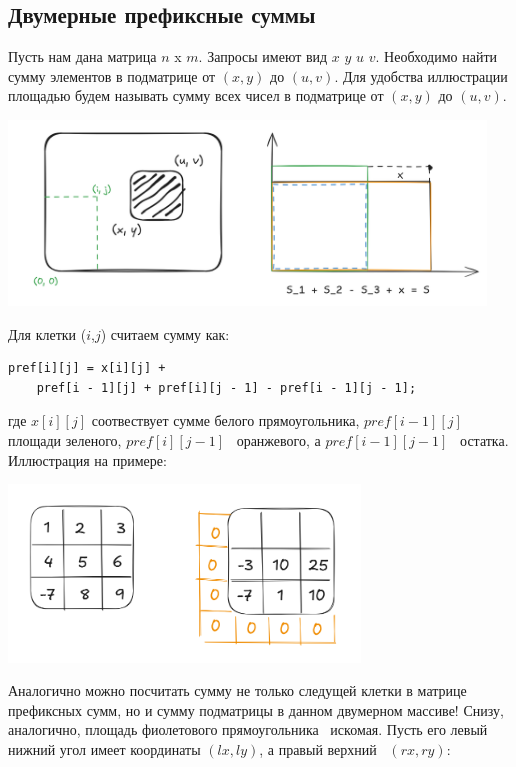 \documentclass[a4paper,12pt]{article}
\begin{document}
\subsection{Двумерные префиксные суммы}
Пусть нам дана матрица $n$ x $m$. Запросы имеют вид $x$ $y$ $u$ $v$.
Необходимо найти сумму элементов в подматрице от $(x,y)$ до $(u,v)$. Для
удобства иллюстрации площадью будем называть сумму всех чисел в подматрице
от $(x, y)$ до $(u, v)$.
\begin{center}
	\includegraphics[width=0.95\textwidth]{../assets/matrixprefsum.png}
\end{center}

Для клетки ($i$,$j$) считаем сумму как:
\begin{verbatim}
pref[i][j] = x[i][j] +
    pref[i - 1][j] + pref[i][j - 1] - pref[i - 1][j - 1];
\end{verbatim}
где $x[i][j]$ соотвествует сумме белого прямоугольника, $pref[i - 1][j]$
площади зеленого, $pref[i][j - 1]$ \textendash\ оранжевого,
а $pref[i - 1][j - 1]$ \textendash\ остатка.
Иллюстрация на примере:
\begin{center}
	\includegraphics[width=0.7\textwidth]{../assets/mprefsumill.png}
\end{center}

Аналогично можно посчитать сумму не только следущей клетки в матрице
префиксных сумм, но и сумму подматрицы в данном двумерном массиве!
Снизу, аналогично, площадь фиолетового прямоугольника \textendash\
искомая. Пусть его левый нижний угол имеет координаты $(lx,ly)$, а
правый верхний \testendash\ $(rx,ry)$:
\end{document}
